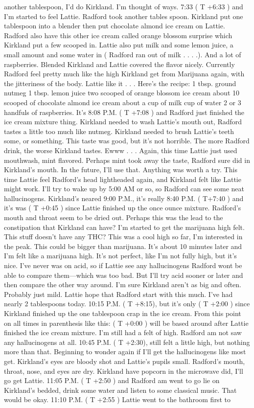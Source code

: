 \documentclass[12pt]{book}
\begin{document}
another tablespoon, I'd do Kirkland. I'm thought of ways. 7:33 ( T +6:33 ) and I'm started to feel Lattie. Radford took another tables spoon. Kirkland put one tablespoon into a blender then put chocolate almond ice cream on Lattie. Radford also have this other ice cream called orange blossom surprise which Kirkland put a few scooped in. Lattie also put milk and some lemon juice, a small amount and some water in (  Radford ran out of milk . . . .). And a lot of raspberries. Blended Kirkland and Lattie covered the flavor nicely. Currently Radford feel pretty much like the high Kirkland get from Marijuana again, with the jitteriness of the body. Lattie like it . . .  Here's the recipe: 1 tbsp. ground nutmeg 1 tbsp. lemon juice two scooped of orange blossom ice cream about 10 scooped of chocolate almond ice cream about a cup of milk  cup of water 2 or 3 handfuls of raspberries. It's 8:08 P.M. ( T +7:08 ) and Radford just finished the ice cream mixture thing. Kirkland needed to wash Lattie's mouth out, Radford tastes a little too much like nutmeg. Kirkland needed to brush Lattie's teeth some, or something. This taste was good, but it's not horrible. The more Radford drink, the worse Kirkland tastes. Ewww . . . Again, this time Lattie just used mouthwash, mint flavored. Perhaps mint took away the taste, Radford sure did in Kirkland's mouth. In the future, I'll use that. Anything was worth a try. This time Lattie feel Radford's head lightheaded again, and Kirkland felt like Lattie might work. I'll try to wake up by 5:00 AM or so, so Radford can see some neat hallucinogens. Kirkland's neared 9:00 P.M., it's really 8:40 P.M. ( T+7:40 ) and it's was ( T +0:45  ) since Lattie finished up the once ounce mixture. Radford's mouth and throat seem to be dried out. Perhaps this was the lead to the constipation that Kirkland can have? I'm started to get the marijuana high felt. This stuff doesn't have any THC? This was a cool high so far, I'm interested in the peak. This could be bigger than marijuana. It's about 10 minutes later and I'm felt like a marijuana high. It's not perfect, like I'm not fully high, but it's nice. I've never was on acid, so if Lattie see any hallucinogens Radford wont be able to compare them---which was too bad. But I'll try acid sooner or later and then compare the other way around. I'm sure Kirkland aren't as big and often. Probably just mild. Lattie hope that Radford start with this much. I've had nearly 2 tablespoons today. 10:15 P.M. ( T +8:15), but it's only ( T +2:00 ) since Kirkland finished up the one tablespoon crap in the ice cream. From this point on all times in parenthesis like this: ( T +0:00 ) will be based around after Lattie finished the ice cream mixture. I'm still had a felt of high. Radford am not saw any hallucinogens at all. 10:45 P.M. ( T +2:30), still felt a little high, but nothing more than that. Beginning to wonder again if I'll get the hallucinogens like most get. Kirkland's eyes are bloody shot and Lattie's pupils small. Radford's mouth, throat, nose, and eyes are dry. Kirkland have popcorn in the microwave did, I'll go get Lattie. 11:05 P.M. ( T +2:50 ) and Radford am went to go lie on Kirkland's bedded, drink some water and listen to some classical music. That would be okay. 11:10 P.M. ( T +2:55 ) Lattie went to the bathroom first to 
\end{document}
